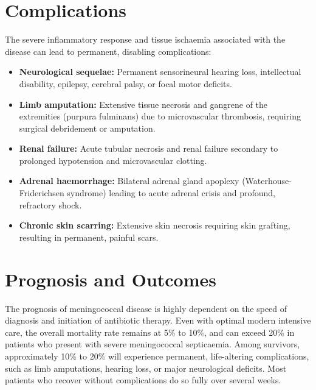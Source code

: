 \section*{Complications}
The severe inflammatory response and tissue ischaemia associated with the disease can lead to permanent, disabling complications:
\begin{itemize}
    \item \textbf{Neurological sequelae:} Permanent sensorineural hearing loss, intellectual disability, epilepsy, cerebral palsy, or focal motor deficits.
    \item \textbf{Limb amputation:} Extensive tissue necrosis and gangrene of the extremities (purpura fulminans) due to microvascular thrombosis, requiring surgical debridement or amputation.
    \item \textbf{Renal failure:} Acute tubular necrosis and renal failure secondary to prolonged hypotension and microvascular clotting.
    \item \textbf{Adrenal haemorrhage:} Bilateral adrenal gland apoplexy (Waterhouse-Friderichsen syndrome) leading to acute adrenal crisis and profound, refractory shock.
    \item \textbf{Chronic skin scarring:} Extensive skin necrosis requiring skin grafting, resulting in permanent, painful scars.
\end{itemize}

\section*{Prognosis and Outcomes}
The prognosis of meningococcal disease is highly dependent on the speed of diagnosis and initiation of antibiotic therapy. Even with optimal modern intensive care, the overall mortality rate remains at 5\% to 10\%, and can exceed 20\% in patients who present with severe meningococcal septicaemia. Among survivors, approximately 10\% to 20\% will experience permanent, life-altering complications, such as limb amputations, hearing loss, or major neurological deficits. Most patients who recover without complications do so fully over several weeks.

